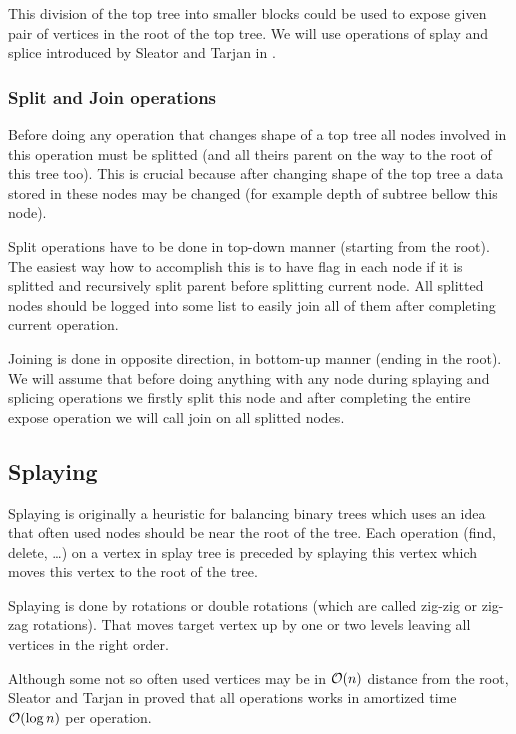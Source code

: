 This division of the top tree into smaller blocks could be used to expose given
pair of vertices in the root of the top tree. We will use operations of
{\I splay} and {\I splice} introduced by Sleator and Tarjan in
\cite{SelfAdjustingBST}.

\subsubsection{Split and Join operations}

Before doing any operation that changes shape of a top tree all nodes involved
in this operation must be splitted (and all theirs parent on the way to the root
of this tree too). This is crucial because after changing shape of the top tree
a data stored in these nodes may be changed (for example depth of subtree bellow
this node).

Split operations have to be done in top-down manner (starting from the root). The
easiest way how to accomplish this is to have flag in each node if it is
splitted and recursively split parent before splitting current node. All
splitted nodes should be logged into some list to easily join all of them after
completing current operation.

Joining is done in opposite direction, in bottom-up manner (ending in the root).
We will assume that before doing anything with any node during splaying and
splicing operations we firstly split this node and after completing the entire
expose operation we will call join on all splitted nodes.

\subsection{Splaying}

Splaying is originally a heuristic for balancing binary trees which uses an idea
that often used nodes should be near the root of the tree. Each operation (find,
delete, \dots) on a vertex in splay tree is preceded by splaying this vertex
which moves this vertex to the root of the tree.

Splaying is done by rotations or double rotations (which are called {\I zig-zig}
or {\I zig-zag} rotations). That moves target vertex up by one or two levels
leaving all vertices in the right order.

Although some not so often used vertices may be in ${\cal O}(n)$ distance from the
root, Sleator and Tarjan in \cite{SelfAdjustingBST} proved that all operations
works in amortized time ${\cal O}(\log n)$ per operation.

